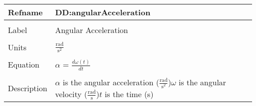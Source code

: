 \documentclass[12pt]{article}
\begin{document}
\noindent \begin{minipage}{\textwidth}
\begin{tabular}{p{} p{}}
\toprule \textbf{Refname} & \textbf{DD:angularAcceleration}
\label{DD:angularAcceleration}
\\ \midrule \\
Label & Angular Acceleration
\\ \midrule \\
Units & $\frac{\text{rad}}{\text{s}^{2}}$
\\ \midrule \\
Equation & $\alpha{}$ = $\frac{d \omega{}\left(t\right)}{d t}$
\\ \midrule \\
Description & $\alpha{}$ is the angular acceleration ($\frac{\text{rad}}{\text{s}^{2}}$)\newline$\omega{}$ is the angular velocity ($\frac{\text{rad}}{\text{s}}$)\newline$t$ is the time (s)
\\ \bottomrule \end{tabular}
\end{minipage}\\
~\newline
\end{document}
